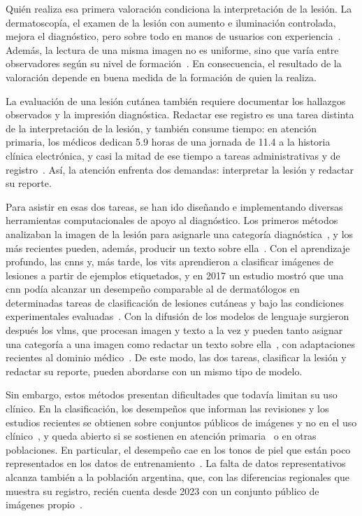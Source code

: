 Quién realiza esa primera valoración condiciona la interpretación de la lesión. La dermatoscopía, el examen de
la lesión con aumento e iluminación controlada, mejora el diagnóstico, pero sobre todo en manos de usuarios con
experiencia~\cite{dinnes2018dermoscopy}. Además, la lectura de una misma imagen no es uniforme, sino que varía
entre observadores según su nivel de formación~\cite{tschandl2019comparison}. En consecuencia, el resultado de
la valoración depende en buena medida de la formación de quien la realiza.

La evaluación de una lesión cutánea también requiere documentar los hallazgos observados y la impresión diagnóstica.
Redactar ese registro es una tarea distinta de la interpretación de la lesión, y también consume tiempo: en atención
primaria, los médicos dedican 5.9 horas de una jornada de 11.4 a la historia clínica electrónica, y casi la
mitad de ese tiempo a tareas administrativas y de registro~\cite{arndt2017tethered}. Así, la atención enfrenta dos demandas: interpretar la lesión y redactar su reporte.

Para asistir en esas dos tareas, se han ido diseñando e implementando diversas herramientas computacionales de
apoyo al diagnóstico. Los primeros métodos analizaban la imagen de la lesión para asignarle una categoría
diagnóstica~\cite{codella2019skin,tschandl2019comparison}, y los más recientes pueden, además, producir un texto
sobre ella~\cite{zhou2023skingpt4}. Con el aprendizaje profundo, las
\glspl{cnn} y, más tarde, los \glspl{vit} aprendieron a clasificar imágenes de lesiones a partir de ejemplos
etiquetados, y en 2017 un estudio mostró que una \gls{cnn} podía alcanzar un desempeño comparable al de
dermatólogos en determinadas tareas de clasificación de lesiones cutáneas y bajo las condiciones experimentales evaluadas~\cite{esteva2017dermatologistlevel}. Con la difusión de los modelos de lenguaje surgieron después
los \glspl{vlm}, que procesan imagen y texto a la vez y pueden tanto asignar una categoría a una imagen como
redactar un texto sobre ella~\cite{radford2021learning,liu2023visual}, con adaptaciones recientes al dominio
médico~\cite{li2023llavamed}. De este modo, las dos tareas, clasificar la lesión y redactar su reporte, pueden
abordarse con un mismo tipo de modelo.

Sin embargo, estos métodos presentan dificultades que todavía limitan su uso clínico. En la clasificación, los
desempeños que informan las revisiones y los estudios recientes se obtienen sobre conjuntos públicos de imágenes
y no en el uso clínico~\cite{magalhaes2024systematic,kreouzi2024learning}, y queda abierto si se sostienen en
atención primaria~\cite{jones2022intelligence} o en otras poblaciones. En particular, el desempeño cae en los
tonos de piel que están poco representados en los datos de entrenamiento~\cite{daneshjou2022disparities,groh2021neural}.
La falta de datos representativos alcanza también a la población argentina, que, con las diferencias regionales
que muestra su registro, recién cuenta desde 2023 con un conjunto público de imágenes
propio~\cite{riccilara2023dataset}.

